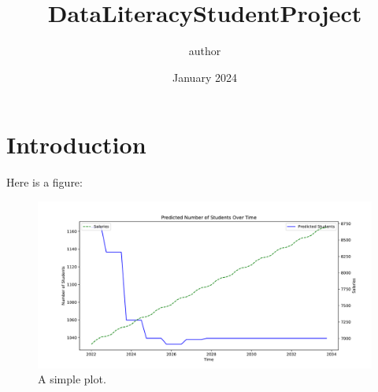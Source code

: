 \documentclass{article}
\title{DataLiteracyStudentProject}
\author{author}
\date{January 2024}
\begin{document}
\maketitle

\section{Introduction}

Here is a figure:

\begin{figure}[h!]
  \centering
  \includegraphics[width=\textwidth]{fig/RandomForestRegressorPrediction.pdf}
  \caption{A simple plot.}
  \label{fig:plot1}
\end{figure}
\end{document}
